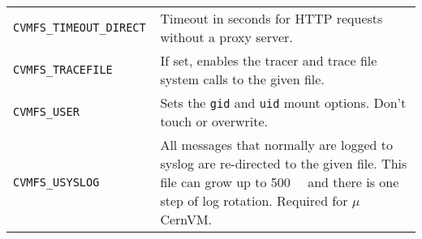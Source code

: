 \begin{longtable}{lX}
		\tt CVMFS\_TIMEOUT\_DIRECT 		& Timeout in seconds for HTTP requests without a proxy server.\\
		\tt CVMFS\_TRACEFILE				& If set, enables the tracer and trace file system calls to the given file.\\
		\tt CVMFS\_USER						& Sets the \texttt{gid} and \texttt{uid} mount options. Don't touch or overwrite.\\
		\tt CVMFS\_USYSLOG					& All messages that normally are logged to syslog are re-directed to the given file.  This file can grow up to \SI{500}{\kilo\byte} and there is one step of log rotation.  Required for $\mu$CernVM.\\
		\bottomrule
	\end{longtable}
